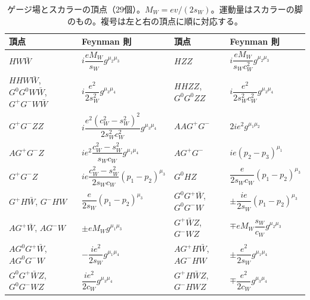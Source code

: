 \documentclass[a4paper,10pt]{ltjsarticle}
\newcommand{\sw}{s_W}
\newcommand{\cw}{c_W}
\begin{document}
\begin{table}[tbp]
\centering\small\renewcommand{\arraystretch}{1.75}
\caption{ゲージ場とスカラーの頂点（29個）。$M_W=ev/(2\sw)$。運動量はスカラーの脚のもの。複号は左と右の頂点に順に対応する。}
\label{tab:rules-vs}
\begin{tabular}{llll}
\toprule
頂点 & Feynman 則 & 頂点 & Feynman 則 \\
\midrule
$HW\bar W$ & $i\dfrac{eM_W}{\sw}g^{\mu_2\mu_3}$ & $HZZ$ & $i\dfrac{eM_W}{\sw\cw^2}g^{\mu_2\mu_3}$ \\
$HHW\bar W$, $G^0G^0W\bar W$, $G^+G^-W\bar W$ & $i\dfrac{e^2}{2\sw^2}g^{\mu_3\mu_4}$ & $HHZZ$, $G^0G^0ZZ$ & $i\dfrac{e^2}{2\sw^2\cw^2}g^{\mu_3\mu_4}$ \\
$G^+G^-ZZ$ & $i\dfrac{e^2(\cw^2-\sw^2)^2}{2\sw^2\cw^2}g^{\mu_3\mu_4}$ & $AAG^+G^-$ & $2ie^2g^{\mu_1\mu_2}$ \\
$AG^+G^-Z$ & $ie^2\dfrac{\cw^2-\sw^2}{\sw\cw}g^{\mu_1\mu_4}$ & $AG^+G^-$ & $ie(p_2-p_3)^{\mu_1}$ \\
$G^+G^-Z$ & $ie\dfrac{\cw^2-\sw^2}{2\sw\cw}(p_1-p_2)^{\mu_3}$ & $G^0HZ$ & $\dfrac{e}{2\sw\cw}(p_1-p_2)^{\mu_3}$ \\
$G^+H\bar W$, $G^-HW$ & $\dfrac{e}{2\sw}(p_1-p_2)^{\mu_3}$ & $G^0G^+\bar W$, $G^0G^-W$ & $\pm\dfrac{ie}{2\sw}(p_1-p_2)^{\mu_3}$ \\
$AG^+\bar W$, $AG^-W$ & $\pm eM_Wg^{\mu_1\mu_3}$ & $G^+\bar WZ$, $G^-WZ$ & $\mp eM_W\dfrac{\sw}{\cw}g^{\mu_2\mu_3}$ \\
$AG^0G^+\bar W$, $AG^0G^-W$ & $-\dfrac{ie^2}{2\sw}g^{\mu_1\mu_4}$ & $AG^+H\bar W$, $AG^-HW$ & $\pm\dfrac{e^2}{2\sw}g^{\mu_1\mu_4}$ \\
$G^0G^+\bar WZ$, $G^0G^-WZ$ & $\dfrac{ie^2}{2\cw}g^{\mu_3\mu_4}$ & $G^+H\bar WZ$, $G^-HWZ$ & $\mp\dfrac{e^2}{2\cw}g^{\mu_3\mu_4}$ \\
\bottomrule
\end{tabular}
\end{table}
\end{document}
